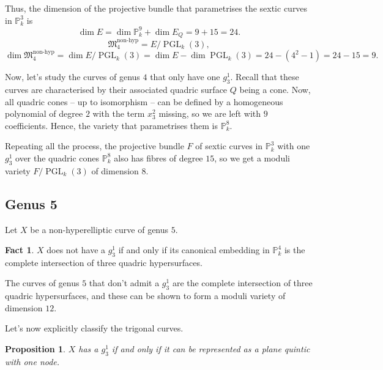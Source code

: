 \documentclass[12pt]{article}
\newtheorem*{proposition}{Proposition}
\theoremstyle{definition}
\newtheorem*{fact}{Fact}
\DeclareMathOperator{\PGL}{PGL}
\begin{document}
Thus, the dimension of the projective bundle that parametrises the sextic curves in $\mathbb{P}_k^3$ is
\[\dim E=\dim\mathbb{P}_k^9+\dim E_Q=9+15=24.\]
\[\mathfrak{M}_4^{\text{non-hyp}}=E/\PGL_k(3),\]
\[\dim\mathfrak{M}_4^{\text{non-hyp}}=\dim E/\PGL_k(3)=\dim E-\dim\PGL_k(3)=24-(4^2-1)=24-15=9.\]

Now, let's study the curves of genus $4$ that only have one $g_3^1$. Recall that these curves are characterised by their associated quadric surface $Q$ being a cone. Now, all quadric cones -- up to isomorphism -- can be defined by a homogeneous polynomial of degree $2$ with the term $x_3^2$ missing, so we are left with $9$ coefficients. Hence, the variety that parametrises them is $\mathbb{P}_k^8$.

Repeating all the process, the projective bundle $F$ of sextic curves in $\mathbb{P}_k^3$ with one $g_3^1$ over the quadric cones $\mathbb{P}_k^8$ also has fibres of degree $15$, so we get a moduli variety $F/\PGL_k(3)$ of dimension $8$.

\subsection{Genus 5}

Let $X$ be a non-hyperelliptic curve of genus $5$.

\begin{fact}
$X$ does not have a $g_3^1$ if and only if its canonical embedding in $\mathbb{P}_k^4$ is the complete intersection of three quadric hypersurfaces.
\end{fact}

The curves of genus $5$ that don't admit a $g_3^1$ are the complete intersection of three quadric hypersurfaces, and these can be shown to form a moduli variety of dimension $12$.

Let's now explicitly classify the trigonal curves.

\begin{proposition}
$X$ has a $g_3^1$ if and only if it can be represented as a plane quintic with one node.
\end{proposition}
\end{document}
